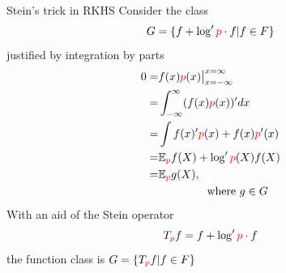 \begin{frame}
\begin{columns}
\begin{column}{.33\linewidth}
\begin{block}{Stein's trick in RKHS}
Consider the  class \large
$$G = \{ f  +  \log' { \color{red} p} \cdot  f | f \in F \}$$
\normalsize
justified by integration by parts
\begin{align*}
 0= &  f(x) {\color{red} p}(x)  \big|_{x=-\infty}^{x=\infty} \\
   = &  \int_{-\infty}^{\infty} (f(x) {\color{red} p}(x) )'  dx \\
   = &  \int   f(x)' { \color{red} p}(x)   + f(x){\color{red} p}'(x)  \\
   = &  \mathbb{E}_{\color{red} p} f(X)  +  \log' {\color{red} p}(X) f(X) \\
   = & \mathbb{E}_{\color{red} p} g(X), \\
    & \quad \quad \quad  \quad  \text{ where } g \in G
\end{align*}
With an aid of the Stein operator 
\[
 T_{{ \color{red} p}}f =  f  +  \log' { \color{red} p} \cdot  f
\]
the function class is $G = \{ T_{{ \color{red} p}}f | f \in F \}$
\end{block}
\vspace{-0.75cm}


\end{column}
\end{columns}
\end{frame}
